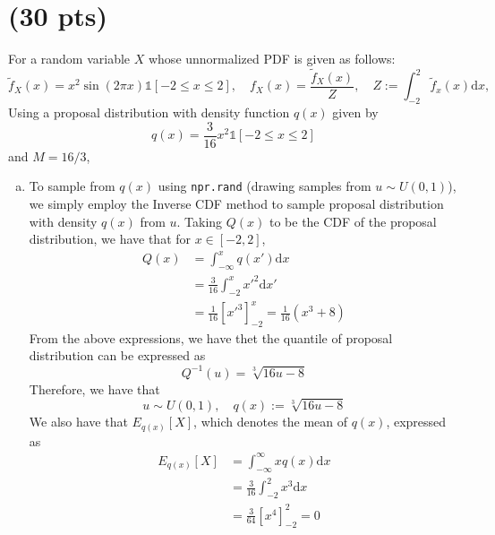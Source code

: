 \section{ (30 pts)}
For a random variable $X$ whose unnormalized PDF is given as follows:
\begin{equation*}
	\tilde{f}_X(x) = x^2 \sin(2\pi x)\mathds{1}[-2 \leq x \leq 2], \quad f_X(x) = \frac{\tilde{f}_X(x)}{Z}, \quad Z:=\int_{-2}^2 \tilde{f}_x(x) \mathrm{d}x,
\end{equation*}
Using a proposal distribution with density function $q(x)$ given by
\begin{equation*}
	q(x) = \frac{3}{16}x^2 \mathds{1}[-2 \leq x \leq 2]
\end{equation*}
and $M = 16/3$,

\begin{enumerate} [(a)]
	\item \label{2(a)} To sample from $q(x)$ using \verb|npr.rand| (drawing samples from $u \sim U(0,1)$), we simply employ the Inverse CDF method to sample proposal distribution with density $q(x)$ from $u$. Taking $Q(x)$ to be the CDF of the proposal distribution, we have that for $x \in [-2,2]$,
	\begin{equation*}
		\begin{aligned}
			Q(x) &= \int_{-\infty}^x q(x')\mathrm{d}x \\
			&= \frac{3}{16} \int_{-2}^x {x'}^2 \mathrm{d}x' \\
			&= \frac{1}{16} \left[{x'}^3\right]_{-2}^{x} = \frac{1}{16} \left(x^3+8\right)
		\end{aligned}
	\end{equation*}
	From the above expressions, we have thet the quantile of proposal distribution can be expressed as
	\begin{equation*}
		Q^{-1}(u) = \sqrt[3]{16u - 8}
	\end{equation*}
	Therefore, we have that
	\begin{equation*}
		u \sim U(0,1), \quad q(x):=\sqrt[3]{16u-8}
	\end{equation*}
	We also have that $E_{q(x)}[X]$, which denotes the mean of $q(x)$, expressed as
	\begin{equation*}
		\begin{aligned}
			E_{q(x)}[X] &= \int_{-\infty}^{\infty} xq(x)\mathrm{d}x \\
			&= \frac{3}{16} \int_{-2}^{2} x^3 \mathrm{d}x \\
			&= \frac{3}{64}\left[x^4\right]_{-2}^{2} = 0
		\end{aligned}

\end{equation*}
\end{enumerate}
